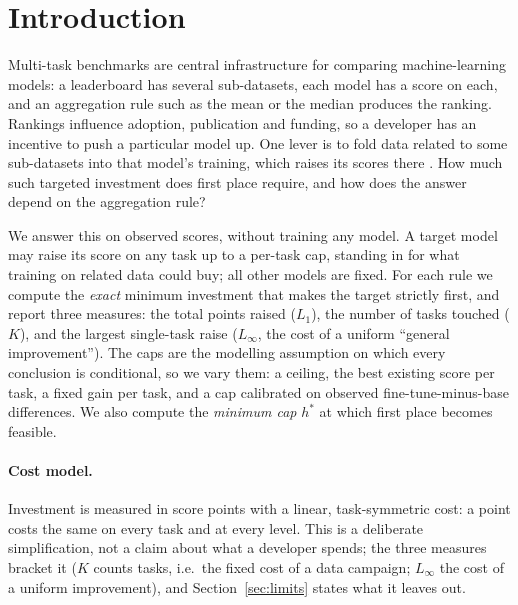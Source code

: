 \section{Introduction}
\label{sec:intro}

Multi-task benchmarks are central infrastructure for comparing machine-learning models: a leaderboard has several sub-datasets, each model has a score on each, and an aggregation rule such as the mean or the median produces the ranking. Rankings influence adoption, publication and funding, so a developer has an incentive to push a particular model up. One lever is to fold data related to some sub-datasets into that model's training, which raises its scores there \citep{dominguezolmedo2024ttt,zhou2023cheater}. How much such targeted investment does first place require, and how does the answer depend on the aggregation rule?

We answer this on observed scores, without training any model. A target model may raise its score on any task up to a per-task cap, standing in for what training on related data could buy; all other models are fixed. For each rule we compute the \emph{exact} minimum investment that makes the target strictly first, and report three measures: the total points raised ($L_1$), the number of tasks touched ($K$), and the largest single-task raise ($L_\infty$, the cost of a uniform ``general improvement''). The caps are the modelling assumption on which every conclusion is conditional, so we vary them: a ceiling, the best existing score per task, a fixed gain per task, and a cap calibrated on observed fine-tune-minus-base differences. We also compute the \emph{minimum cap} $h^\ast$ at which first place becomes feasible.

\paragraph{Cost model.} Investment is measured in score points with a linear, task-symmetric cost: a point costs the same on every task and at every level. This is a deliberate simplification, not a claim about what a developer spends; the three measures bracket it ($K$ counts tasks, i.e.\ the fixed cost of a data campaign; $L_\infty$ the cost of a uniform improvement), and Section~\ref{sec:limits} states what it leaves out.


